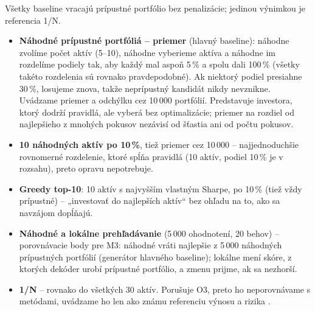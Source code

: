 \documentclass[10pt,a4paper]{article}
\begin{document}
Všetky baseline vracajú prípustné portfólio bez penalizácie; jedinou výnimkou je referencia 1/N.
\begin{itemize}
\item \textbf{Náhodné prípustné portfóliá -- priemer} (hlavný baseline): náhodne zvolíme počet aktív
  (5--10), náhodne vyberieme aktíva a náhodne im rozdelíme podiely tak, aby každý mal aspoň 5\,\%
  a spolu dali 100\,\% (všetky takéto rozdelenia sú rovnako pravdepodobné). Ak niektorý podiel presiahne
  30\,\%, losujeme znova, takže neprípustný kandidát nikdy nevznikne. Uvádzame priemer a odchýlku cez
  10\,000 portfólií. Predstavuje investora, ktorý dodrží pravidlá, ale vyberá bez optimalizácie; priemer na
  rozdiel od najlepšieho z mnohých pokusov nezávisí od šťastia ani od počtu pokusov.
\item \textbf{10 náhodných aktív po 10\,\%}, tiež priemer cez 10\,000 -- najjednoduchšie rovnomerné
  rozdelenie, ktoré spĺňa pravidlá (10 aktív, podiel 10\,\% je v rozsahu), preto opravu nepotrebuje.
\item \textbf{Greedy top-10}: 10 aktív s najvyšším vlastným Sharpe, po 10\,\% (tiež vždy prípustné) --
  „investovať do najlepších aktív“ bez ohľadu na to, ako sa navzájom dopĺňajú.
\item \textbf{Náhodné a lokálne prehľadávanie} (5\,000 ohodnotení, 20 behov) -- porovnávacie body pre M3:
  náhodné vráti najlepšie z 5\,000 náhodných prípustných portfólií (generátor hlavného baseline);
  lokálne mení skóre, z ktorých dekóder urobí prípustné portfólio, a zmenu prijme, ak sa nezhorší.
\item \textbf{1/N} -- rovnako do všetkých 30 aktív. Porušuje O3, preto ho neporovnávame s metódami,
  uvádzame ho len ako známu referenciu výnosu a rizika \cite{demiguel2009}.
\end{itemize}

\begin{table}[!ht]
\centering\footnotesize
\caption{Baseline a referencie. Sharpe na optimalizačnom (opt.) a testovacom období, efektívny počet
aktív $N_\text{eff}$; ostatné stĺpce na teste: ročný výnos, kolísanie, najväčší prepad (\%) a konečná suma z 10\,000\,USD.
Pri priemeroch je uvedená smerodajná odchýlka cez portfóliá/behy.}
\label{tab:base}
\setlength{\tabcolsep}{4pt}

\end{table}
\end{document}
